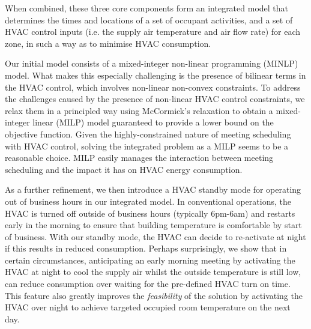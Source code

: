 When combined, these three core components form an integrated model that determines the times and locations of a set of occupant activities, and a set of HVAC control inputs (i.e. the supply air temperature and air flow rate) for each zone, in such a way as to minimise HVAC consumption.

Our initial model consists of a mixed-integer non-linear programming (MINLP) model. What makes this especially challenging is the presence of bilinear terms in the HVAC control, which involves non-linear non-convex constraints. To address the challenges caused by the presence of non-linear HVAC control constraints, we relax them in a principled way using McCormick's relaxation to obtain a mixed-integer linear (MILP) model guaranteed to provide a lower bound on the objective function. Given the highly-constrained nature of meeting scheduling with HVAC control, solving the integrated problem as a MILP seems to be a reasonable choice. MILP easily manages the interaction between meeting scheduling and the impact it has on HVAC energy consumption.

As a further refinement, we then introduce a HVAC standby mode for operating out of business hours in our integrated model. In conventional operations, the HVAC is turned off outside of business hours (typically 6pm-6am) and restarts early in the morning to ensure that building temperature is comfortable by start of business. With our standby mode, the HVAC can decide to re-activate at night if this results in reduced consumption. Perhaps surprisingly, we show that in certain circumstances, anticipating an early morning meeting by activating the HVAC at night to cool the supply air whilst the outside temperature is still low, can reduce consumption over waiting for the pre-defined HVAC turn on time. This feature also greatly improves the \textsl{feasibility} of the solution by activating the HVAC over night to achieve targeted occupied room temperature on the next day.

